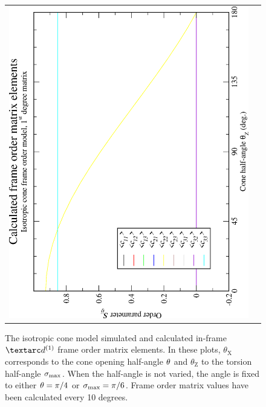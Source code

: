 \begin{figure}
\begin{tabular}{@{}cc@{}}
    \includegraphics[width=.35\textwidth,angle=270]{images/frame_order_matrix/Sij_iso_cone_in_frame_theta_z_calc.eps} \\
  \end{tabular}
  \caption[Isotropic cone simulated and calculated in-frame Daeg$^{(1)}$ elements.]{
    The isotropic cone model simulated and calculated in-frame $\FOone$ frame order matrix elements.
    In these plots, $\theta_\textrm{X}$ corresponds to the cone opening half-angle $\theta$ and $\theta_\textrm{Z}$ to the torsion half-angle $\sigma_\textrm{max}$.
    When the half-angle is not varied, the angle is fixed to either $\theta = \pi/4$ or $\sigma_\textrm{max} = \pi/6$.
    Frame order matrix values have been calculated every 10 degrees.
  }
  \label{fig: simulated and calculated in-frame 1st degree iso cone frame order}
\end{figure}

